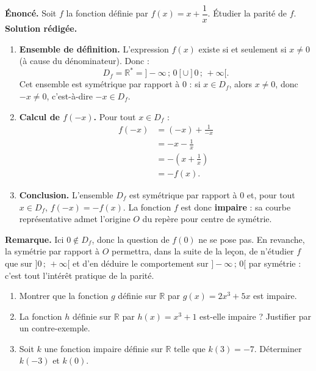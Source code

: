 \documentclass[11pt]{article}
\begin{document}
\begin{exoresolu}[Parité de $f(x) = x + \dfrac{1}{x}$]
\textbf{Énoncé.} Soit $f$ la fonction définie par $f(x) = x + \dfrac{1}{x}$. Étudier la parité de $f$.
\tcblower
\textbf{Solution rédigée.}
\begin{enumerate}
\item \textbf{Ensemble de définition.} L'expression $f(x)$ existe si et seulement si $x \neq 0$ (à cause du dénominateur). Donc :
\[ D_f = \mathbb{R}^* = ]-\infty\,;\,0[ \cup ]0\,;\,+\infty[. \]
Cet ensemble est symétrique par rapport à $0$ : si $x \in D_f$, alors $x \neq 0$, donc $-x \neq 0$, c'est-à-dire $-x \in D_f$.
\item \textbf{Calcul de $f(-x)$.} Pour tout $x \in D_f$ :
\begin{align*}
f(-x) &= (-x) + \frac{1}{-x} \\
&= -x - \frac{1}{x} \\
&= -\left(x + \frac{1}{x}\right) \\
&= -f(x).
\end{align*}
\item \textbf{Conclusion.} L'ensemble $D_f$ est symétrique par rapport à $0$ et, pour tout $x \in D_f$, $f(-x) = -f(x)$. La fonction $f$ est donc \textbf{impaire} : sa courbe représentative admet l'origine $O$ du repère pour centre de symétrie.
\end{enumerate}
\textbf{Remarque.} Ici $0 \notin D_f$, donc la question de $f(0)$ ne se pose pas. En revanche, la symétrie par rapport à $O$ permettra, dans la suite de la leçon, de n'étudier $f$ que sur $]0\,;\,+\infty[$ et d'en déduire le comportement sur $]-\infty\,;\,0[$ par symétrie : c'est tout l'intérêt pratique de la parité.
\end{exoresolu}

\begin{exercice}
\begin{enumerate}
\item Montrer que la fonction $g$ définie sur $\mathbb{R}$ par $g(x) = 2x^3 + 5x$ est impaire.
\item La fonction $h$ définie sur $\mathbb{R}$ par $h(x) = x^3 + 1$ est-elle impaire ? Justifier par un contre-exemple.
\item Soit $k$ une fonction impaire définie sur $\mathbb{R}$ telle que $k(3) = -7$. Déterminer $k(-3)$ et $k(0)$.
\end{enumerate}
\end{exercice}
\end{document}
